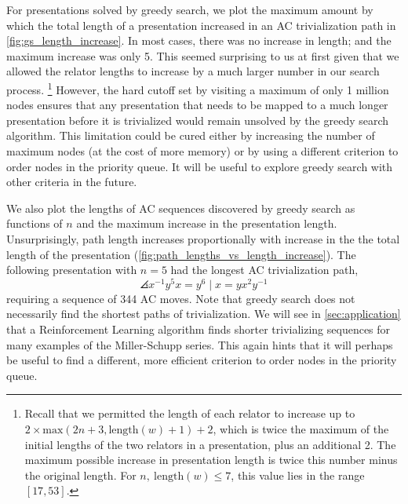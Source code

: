 For presentations solved by greedy search, we plot the maximum amount by which the total length of a presentation increased in an AC trivialization path in \autoref{fig:gs_length_increase}. In most cases, there was no increase in length; and the maximum increase was only 5. This seemed surprising to us at first given that we allowed the relator lengths to increase by a much larger number in our search process. 
\footnote{Recall that we permitted the length of each relator to increase up to \(2 \times \text{max}(2n+3, \text{length}(w)+1) + 2\), which is twice the maximum of the initial lengths of the two relators in a presentation, plus an additional 2. 
The maximum possible increase in presentation length is twice this number minus the original length. For $n, \ \text{length}(w) \leq 7$, this value lies in the range $[17, 53]$. 
} 
However, the hard cutoff set by visiting a maximum of only 1 million nodes ensures that any presentation that needs to be mapped to a much longer presentation before it is trivialized would remain unsolved by the greedy search algorithm. This limitation could be cured either by increasing the number of maximum nodes (at the cost of more memory) or by using a different criterion to order nodes in the priority queue. It will be useful to explore greedy search with other criteria in the future. 
\newline

We also plot the lengths of AC sequences discovered by greedy search as functions of $n$ and the maximum increase in the presentation length. Unsurprisingly, path length increases proportionally with increase in the the total length of the presentation (\autoref{fig:path_lengths_vs_length_increase}). 
The following presentation with $n=5$ had the longest AC trivialization path,
\[
\angles{x^{-1} y^5 x = y^6 \mid  x = y x^2 y^{-1}}
\]
requiring a sequence of 344 AC moves. Note that greedy search does not necessarily find the shortest paths of trivialization. We will see in \autoref{sec:application} that a Reinforcement Learning algorithm finds shorter trivializing sequences for many examples of the Miller-Schupp series. This again hints that it will perhaps be useful to find a different, more efficient criterion to order nodes in the priority queue.  
	
